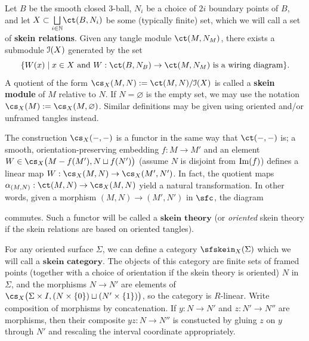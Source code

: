 \begin{definition}
Let $B$ be the smooth closed $3$-ball, $N_i$ be a choice of $2i$ boundary points of $B$, and let $X \subset \underset{i \in \N}{\bigsqcup} \ct(B, N_i)$ be some (typically finite) set, which we will call a set of \textbf{skein relations}. Given any tangle module $\ct(M, N_M)$, there exists a submodule $\mathcal{I}(X)$ generated by the set 
\[\{ W(x) \mid x \in X \text{ and } W:\ct(B, N_B) \to \ct(M, N_M) \text{ is a wiring diagram} \}.\] 
A quotient of the form $\cs_X(M, N) := \ct(M, N) / \ci(X)$ is called a \textbf{skein module} of $M$ relative to $N$. If $N = \varnothing$ is the empty set, we may use the notation $\cs_X(M) := \cs_X(M, \varnothing)$. Similar definitions may be given using oriented and/or unframed tangles instead. 
\end{definition}
The construction $\cs_X(-, -)$ is a functor in the same way that $\ct(-, -)$ is; a smooth, orientation-preserving embedding $f: M \to M'$ and an element $W \in \cs_X\big( M-f(M'), N \sqcup f(N') \big)$ (assume $N$ is disjoint from ${\rm{Im}}(f)$) defines a linear map $W: \cs_X(M, N) \to \cs_X(M', N')$. In fact, the quotient maps $\alpha_{(M, N)}: \ct(M, N) \to \cs_X(M, N)$ yield a natural transformation. In other words, given a morphism $(M, N) \to (M', N')$ in $\sfc$, the diagram
\begin{center}
\end{center}
commutes. Such a functor will be called a $\textbf{skein theory}$ (or \textit{oriented} skein theory if the skein relations are based on oriented tangles). 

For any oriented surface $\Sigma$, we can define a category $\sfskein_X(\Sigma)$ which we will call a $\textbf{skein category}$. The objects of this category are finite sets of framed points (together with a choice of orientation if the skein theory is oriented) $N$ in $\Sigma$, and the morphisms $N \to N'$ are elements of $\cs_X\big(\Sigma \times I, (N \times \{0\}) \sqcup (N' \times \{1\})\big)$, so the category is $R$-linear. Write composition of morphisms by concatenation. If $y:N \to N'$ and $z:N' \to N''$ are morphisms, then their composite $yz:N \to N''$ is constucted by gluing $z$ on $y$ through $N'$ and rescaling the interval coordinate appropriately.

